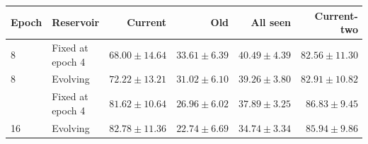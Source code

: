 \begin{tabular}{llrrrr}
\toprule
Epoch & Reservoir & Current & Old & All seen & Current-two \\
\midrule
8 & Fixed at epoch 4 & $68.00\pm14.64$ & $33.61\pm6.39$ & $40.49\pm4.39$ & $82.56\pm11.30$ \\
8 & Evolving & $72.22\pm13.21$ & $31.02\pm6.10$ & $39.26\pm3.80$ & $82.91\pm10.82$ \\
\addlinespace
16 & Fixed at epoch 4 & $81.62\pm10.64$ & $26.96\pm6.02$ & $37.89\pm3.25$ & $86.83\pm9.45$ \\
16 & Evolving & $82.78\pm11.36$ & $22.74\pm6.69$ & $34.74\pm3.34$ & $85.94\pm9.86$ \\
\bottomrule
\end{tabular}
